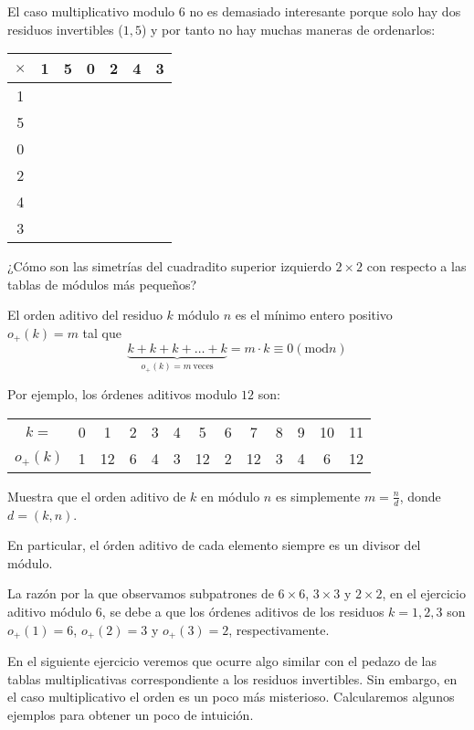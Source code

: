 \begin{ejercicio}
El caso multiplicativo modulo $6$ no es demasiado interesante porque solo hay dos residuos invertibles ($1,5$) y por tanto no hay muchas maneras de ordenarlos:

 \begin{tabular}{|c||c|c|c|c|c|c|} 
 \hline
  $\times$ & 1 & 5 & 0 & 2 & 4 & 3\\ 
  \hline
  \hline
  1 &  & & & & & \\ 
  \hline
  5 &  & & & & &\\
    \hline
  0 &  & & & & & \\
      \hline
  2 &  & & & & &\\ 
        \hline
  4 &  & & & & &\\ 
          \hline
  3 &  & & & & &\\ 
  \hline
\end{tabular}

¿Cómo son las simetrías del cuadradito superior izquierdo $2\times 2$ con respecto a las tablas de módulos más pequeños?
\end{ejercicio}

\begin{definicion}
El orden aditivo del residuo $k$ módulo $n$ es el mínimo entero positivo $o_+(k)=m$ tal que $$\underbrace{k+k+k+\dots+k}_{o_+(k)=m~\text{veces}}=m\cdot k\equiv 0 (\mathrm{mod} n)$$ 
\end{definicion}
Por ejemplo, los órdenes aditivos modulo $12$ son:

\begin{tabular}{c||c|c|c|c|c|c|c|c|c|c|c|c|}
    $k=$ & 0 & 1 & 2 & 3 & 4 & 5 & 6 & 7 & 8 & 9 & 10 & 11 \\
    $o_+(k)$ & 1 & 12 & 6 & 4 & 3 & 12 & 2 & 12 & 3 & 4 & 6 & 12 
\end{tabular}

\begin{ejercicio}
Muestra que el orden aditivo de $k$ en módulo $n$ es simplemente $m=\frac{n}{d}$, donde $d=(k,n)$.
\end{ejercicio}
En particular, el órden aditivo de cada elemento siempre es un divisor del módulo. 

La razón por la que observamos subpatrones de $6\times 6$, $3\times 3$ y $2\times 2$, en el ejercicio aditivo módulo $6$, se debe a que los órdenes aditivos de los residuos $k=1,2,3$ son $o_+(1)=6$, $o_+(2)=3$ y $o_+(3)=2$, respectivamente.

En el siguiente ejercicio veremos que ocurre algo similar con el pedazo de las tablas multiplicativas correspondiente a los residuos invertibles. Sin embargo, en el caso multiplicativo el orden es un poco más misterioso. Calcularemos algunos ejemplos para obtener un poco de intuición.

